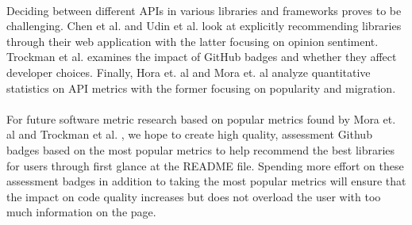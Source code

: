 \documentclass[12pt]{article}
\begin{document}
\paragraph{}
Deciding between different APIs in various libraries and frameworks proves to be challenging. 
Chen et al. \cite{analogical} and Udin et al. \cite{opinerarticle} look at explicitly recommending libraries through their web application with the latter 
focusing on opinion sentiment. Trockman et al. \cite{githubbadges} examines the impact of GitHub \cite{github} badges and whether they affect developer choices.
Finally, Hora et. al \cite{apiwave} and Mora et. al \cite{metrics} analyze quantitative statistics on API metrics with the former focusing on popularity and migration.

\paragraph{}
For future software metric research based on popular metrics found by Mora et. al \cite{metrics}
and Trockman et al. \cite{githubbadges}, we hope to create high quality, assessment Github \cite{github} badges
based on the most popular metrics to help recommend the best libraries for users through first
glance at the README file. Spending more effort on these assessment badges in addition to taking the most popular metrics 
will ensure that the impact on code quality increases
but does not overload the user with too much information on the page. 

\newpage


\end{document}
